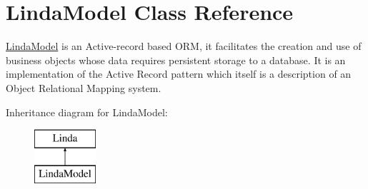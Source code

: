 \hypertarget{class_linda_model}{}\section{Linda\+Model Class Reference}
\label{class_linda_model}


\hyperlink{class_linda_model}{Linda\+Model} is an Active-\/record based O\+R\+M, it facilitates the creation and use of business objects whose data requires persistent storage to a database. It is an implementation of the Active Record pattern which itself is a description of an Object Relational Mapping system.  


Inheritance diagram for Linda\+Model\+:\begin{figure}[H]
\begin{center}
\leavevmode
\includegraphics[height=2.000000cm]{class_linda_model}
\end{center}
\end{figure}
